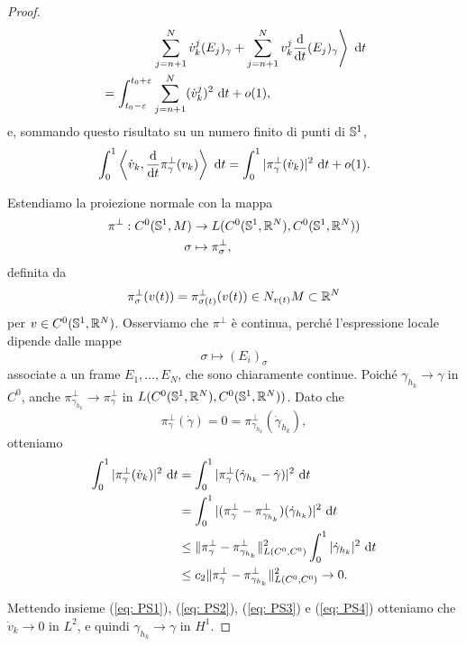 \begin{proof}
\begin{align*}
		& \qquad \qquad \left.\sum_{j=n+1}^N \dot v^j_k (E_j)_\gamma + \sum_{j=n+1}^N v^j_k \frac{\dif}{\dif t} (E_j)_\gamma \right\rangle \ \dif t  \\
		&= 	\int_{t_0-\ve}^{t_0+\ve} \sum_{j=n+1}^N (\dot v^j_k)^2 \ \dif t+ o(1),
	\end{align*}
	e, sommando questo risultato su un numero finito di punti di \(\mathbb{S}^1\),
	\begin{equation}\label{eq: PS3}
			\int_{0}^{1} \left \langle \dot v_k, \frac{\mathrm{d}}{\mathrm{d} t} \pi^\perp_\gamma(v_k) \right\rangle \ \mathrm{d} t  =  \int_0^1 |\pi^\perp_\gamma (\dot v_k)|^2 \ \mathrm{d} t + o(1).
	\end{equation}
	
	Estendiamo la proiezione normale con la mappa
	\begin{align*}
		\pi^\perp : C^0(\mathbb{S}^1,M) &\to L(C^0(\mathbb{S}^1,\mathbb{R}^N),C^0(\mathbb{S}^1,\mathbb{R}^N))\\
		\sigma &\mapsto \pi^\perp_\sigma,
	\end{align*}
	definita da 
	\[
		\pi^\perp_\sigma (v(t)) = \pi^\perp_{\sigma(t)}(v(t)) \in N_{v(t)}M \subset \mathbb{R}^N
	\]
	per \(v \in C^0(\mathbb{S}^1,\mathbb{R}^N)\). Osserviamo che \(\pi^\perp\) è continua, perché l'espressione locale dipende dalle mappe
	\[
		\sigma \mapsto (E_i)_\sigma
	\] 
	associate a un frame \(E_1, \dots , E_N\), che sono chiaramente continue. Poiché \(\gamma_{h_k} \to \gamma\) in \(C^0\), anche \(\pi^\perp_{\gamma_{h_k}} \to \pi^\perp_\gamma\) in \(L(C^0(\mathbb{S}^1,\mathbb{R}^N),C^0(\mathbb{S}^1,\mathbb{R}^N))\). Dato che 
	\[
		\pi^\perp_\gamma(\dot \gamma) = 0 = \pi^\perp_{\gamma_{h_k}}(\dot \gamma_{h_k}),
	\]
	otteniamo
	\begin{align}\label{eq: PS4}
		\int_0^1 |\pi^\perp_\gamma (\dot v_k)|^2 \ \mathrm{d} t &= \int_0^1 |\pi^\perp_\gamma (\dot \gamma_{h_k}- \dot \gamma)|^2 \ \mathrm{d} t \nonumber \\
		&= \int_0^1 |(\pi^\perp_\gamma - \pi^\perp_{\gamma_{h_k}})(\dot \gamma_{h_k})|^2 \ \mathrm{d} t \nonumber \\
		& \leq \|\pi^\perp_\gamma - \pi^\perp_{\gamma_{h_k}}\|^2_{L(C^0,C^0)} \int_0^1|\dot \gamma_{h_k}|^2 \ \mathrm{d} t \nonumber \\
		& \leq c_2 \|\pi^\perp_\gamma - \pi^\perp_{\gamma_{h_k}}\|^2_{L(C^0,C^0)} \to 0.
	\end{align}
	
	Mettendo insieme (\ref{eq: PS1}), (\ref{eq: PS2}), (\ref{eq: PS3}) e (\ref{eq: PS4}) otteniamo che \(\dot v_k \to 0\) in \(L^2\), e quindi \(\gamma_{h_k} \to \gamma\) in \(H^1\).
\end{proof}

